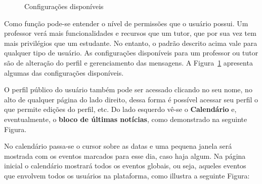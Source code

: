 \begin{figure}[htbp]
 \begin{center}
  \caption{Configurações disponíveis}
  \label{fig:conf disp}
 \end{center}
\end{figure}


Como função pode-se entender o nível de permissões que o usuário possui. Um professor verá mais funcionalidades e recursos que um tutor, que por sua vez tem mais privilégios que um estudante. No entanto, o padrão descrito acima vale para qualquer tipo de usuário. As configurações disponíveis para um professor ou tutor são de alteração do perfil e gerenciamento das mensagens. A Figura~\ref{fig:conf disp} apresenta algumas das configurações disponíveis.


O perfil público do usuário também pode ser acessado clicando no seu nome, no alto de qualquer página do lado direito, dessa forma é possível acessar seu perfil o que permite edições do perfil, etc. Do lado esquerdo vê-se o \textbf{Calendário} e, eventualmente, o \textbf{bloco de últimas notícias}, como demonstrado na seguinte Figura.

\begin{center}
\end{center}

No calendário passa-se o cursor sobre as datas e uma pequena janela será mostrada com os eventos marcados para esse dia, caso haja algum. Na página inicial o calendário mostrará todos os eventos globais, ou seja, aqueles eventos que envolvem todos os usuários na plataforma, como illustra a seguinte Figura:

\begin{center}
\end{center}


